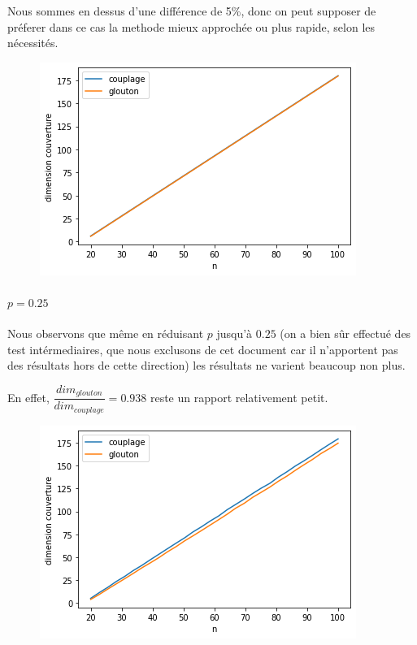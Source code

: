 \documentclass[12pt]{article}
\begin{document}
\begin{enumerate}
                Nous sommes en dessus d'une différence de 5\%, donc on peut supposer de préferer dans ce cas la methode mieux approchée ou plus rapide, selon les nécessités.
                \begin{figure}[H]
                    \includegraphics[scale=0.5]{figures/qualite_1.png}
                    \centering
                \end{figure}

                \paragraph{$p = 0.25$}{
                    Nous observons que même en réduisant $p$ jusqu'à $0.25$ (on a bien sûr effectué des test intérmediaires, que nous exclusons de cet document car il n'apportent pas des résultats hors de cette direction) les résultats ne varient beaucoup non plus.
                    
                    En effet, $\dfrac{dim_{glouton}}{dim_{couplage}} = 0.938 $ reste un rapport relativement petit.
                    
                    \begin{figure}[H]
                        \includegraphics[scale=0.5]{figures/qualite_025.png}
                        \centering
                    \end{figure}
                }

\end{enumerate}
\end{document}
